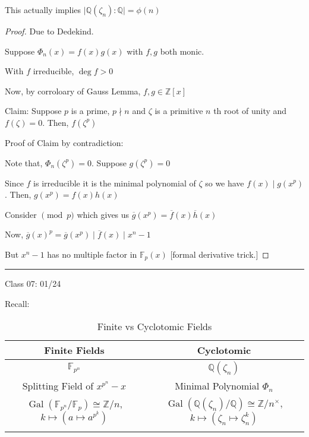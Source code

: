 \documentclass{article}
\theoremstyle{definition}
\begin{document}
This actually implies \(\vert \mathbb{Q} (\zeta _n) : \mathbb{Q}  \vert =\phi(n)\) 

\begin{proof}
    Due to Dedekind.

    Suppose \(\Phi_n(x)=f(x)g(x)\) with \(f,g\) both monic.

    With \(f\) irreducible, \(\deg f > 0\)
    
    Now, by corroloary of Gauss Lemma, \(f,g\in \mathbb{Z} [x]\) 

    Claim: Suppose \(p\) is a prime, \(p\nmid n\) and \(\zeta \) is a primitive \(n\) th root of unity and \(f(\zeta) = 0\). Then, \(f(\zeta^p)\) 
    
    Proof of Claim by contradiction:

    Note that, \(\Phi_n(\zeta ^p)=0\). Suppose \(g(\zeta ^p)=0\) 

    Since \(f\) is irreducible it is the minimal polynomial of \(\zeta \) so we have \(f(x)\mid g(x^p)\). Then, \(g(x^p)=f(x)h(x)\)  

    Consider \(\pmod p\) which gives us \(\overline{g}(x^p)=\overline{f}(x)\overline{h}(x)  \) 

    Now, \(\overline{g}(x)^p = \overline{g}(x^p)\mid \overline{f}(x)\mid x^n - 1  \) 

    But \(x^n - 1\) has no multiple factor in \(\mathbb{F} _p(x)\) [formal derivative trick.]

    

\end{proof}

\hfil
\hrule

Class 07: 01/24

Recall:

\begin{table}[H]
    \centering
    \begin{tabular}{c|c}
        \toprule
            Finite Fields &  Cyclotomic \\
        \midrule
            \(\mathbb{F}_{p^n}\)  &  \(\mathbb{Q}(\zeta _n)\)  \\
            Splitting Field of \(x^{p^n}-x\)  & Minimal Polynomial \(\Phi_n\)   \\
            \(\operatorname{Gal}(\mathbb{F} _{p^n} / \mathbb{F} _p) \cong \mathbb{Z} /n \), \(k \mapsto (a \mapsto a^{p^k})\)   & \(\operatorname{Gal}(\mathbb{Q} (\zeta _n) / \mathbb{Q}) \cong \mathbb{Z} / n^\times \), \(k \mapsto (\zeta_n \mapsto \zeta_n^k)\)   \\
             &   \\
        \bottomrule
    \end{tabular}
    \caption{Finite vs Cyclotomic Fields}
    \label{tab:finvscycl2}
\end{table}
\end{document}
